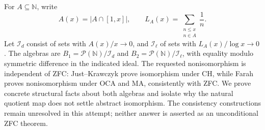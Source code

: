 For $A\subseteq\mathbb N$, write
\[
 A(x)=|A\cap[1,x]|,\qquad L_A(x)=\sum_{\substack{n\le x\\n\in A}}\frac1n.
\]
Let $\mathcal I_d$ consist of sets with $A(x)/x\to0$, and $\mathcal I_\ell$ of sets with $L_A(x)/\log x\to0$. The algebras are $B_1=\mathcal P(\mathbb N)/\mathcal I_d$ and $B_2=\mathcal P(\mathbb N)/\mathcal I_\ell$, with equality modulo symmetric difference in the indicated ideal.
The requested nonisomorphism is independent of ZFC: Just--Krawczyk prove isomorphism under CH, while Farah proves nonisomorphism under OCA and MA, consistently with ZFC. We prove concrete structural facts about both algebras and isolate why the natural quotient map does not settle abstract isomorphism. The consistency constructions remain unresolved in this attempt; neither answer is asserted as an unconditional ZFC theorem.
